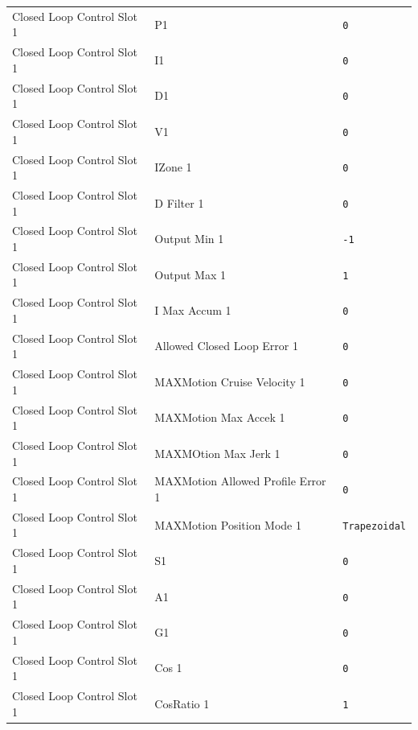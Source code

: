 \begin{longtable}{p{3.5cm} p{8cm} p{3cm}}
Closed Loop Control Slot 1 & P1 & \texttt{0} \\
Closed Loop Control Slot 1 & I1 & \texttt{0} \\
Closed Loop Control Slot 1 & D1 & \texttt{0} \\
Closed Loop Control Slot 1 & V1 & \texttt{0} \\
Closed Loop Control Slot 1 & IZone 1 & \texttt{0} \\
Closed Loop Control Slot 1 & D Filter 1 & \texttt{0} \\
Closed Loop Control Slot 1 & Output Min 1 & \texttt{-1} \\
Closed Loop Control Slot 1 & Output Max 1 & \texttt{1} \\
Closed Loop Control Slot 1 & I Max Accum 1 & \texttt{0} \\
Closed Loop Control Slot 1 & Allowed Closed Loop Error 1 & \texttt{0} \\
Closed Loop Control Slot 1 & MAXMotion Cruise Velocity 1 & \texttt{0} \\
Closed Loop Control Slot 1 & MAXMotion Max Accek 1 & \texttt{0} \\
Closed Loop Control Slot 1 & MAXMOtion Max Jerk 1 & \texttt{0} \\
Closed Loop Control Slot 1 & MAXMotion Allowed Profile Error 1 & \texttt{0} \\
Closed Loop Control Slot 1 & MAXMotion Position Mode 1 & \texttt{Trapezoidal} \\
Closed Loop Control Slot 1 & S1 & \texttt{0} \\
Closed Loop Control Slot 1 & A1 & \texttt{0} \\
Closed Loop Control Slot 1 & G1 & \texttt{0} \\
Closed Loop Control Slot 1 & Cos 1 & \texttt{0} \\
Closed Loop Control Slot 1 & CosRatio 1 & \texttt{1} \\


\end{longtable}
